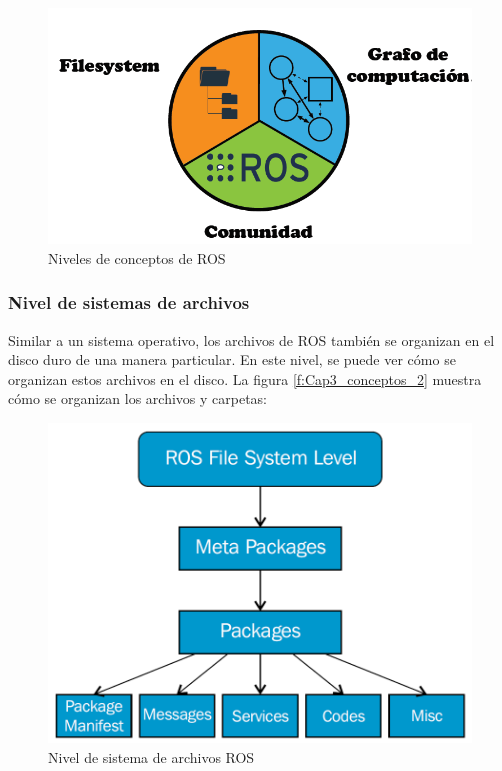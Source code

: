             \begin{figure}[htb]
                \centering
                \includegraphics[width=1\linewidth]{Main/Chapter3/Images3/nivel_s_a_1.png}
                \caption{Niveles de conceptos de ROS}
                \label{f:Cap3_conceptos_1}
            \end{figure} 
            

                
                
               \newpage
               
            \subsubsection{Nivel de sistemas de archivos}

                Similar a un sistema operativo, los archivos de ROS también se organizan en el disco duro de una manera particular. En este nivel, se puede ver cómo se organizan estos archivos en el disco. La figura \eqref{f:Cap3_conceptos_2} muestra cómo se organizan los archivos y carpetas:
                
                
            \begin{figure}[htb]
                \centering
                \includegraphics[width=0.55\linewidth]{Main/Chapter3/Images3/n_s_a_2.png}
                \caption{Nivel de sistema de archivos ROS \cite{lentin_2015}}
                \label{f:Cap3_conceptos_2}
            \end{figure} 
                
